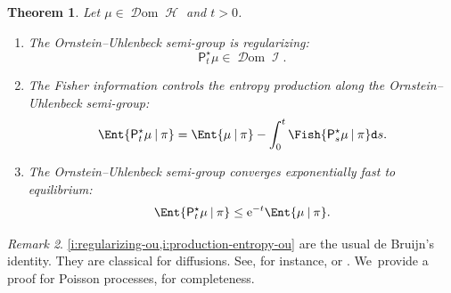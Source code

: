 \documentclass[JEP,XML,SOM,Unicode,published]{cedram}
\newtheorem{theorem}{Theorem}[section]
\theoremstyle{definition}
\theoremstyle{remark}
\newtheorem{remark}[theorem]{Remark}
\newcommand{\given}[1][]{%
\nonscript\:#1\vert
\allowbreak
\nonscript\:
\mathopen{}}
\DeclareMathOperator{\ent}{\mathcal{H}}
\DeclareMathOperator{\fish}{\mathcal{I}}
\DeclareMathOperator{\dom}{\mathscr{D}om}
\begin{document}
\begin{theorem}\label{t:properties-ou}
Let $\mu \in \dom \ent$ and $t > 0$.
\begin{enumerate}[$(\rm i)$, wide]
\item\label{i:regularizing-ou} The Ornstein--Uhlenbeck semi-group is regularizing:
\begin{equation}\label{e:regularizing-ou}
\mathsf{P}^{\star}_{t}\mu \in \dom \fish.
\end{equation}
\item\label{i:production-entropy-ou} The Fisher information controls the entropy production along the Ornstein--Uhlenbeck semi-group:
\begin{equation}\label{e:production-entropy-ou}
\Ent{\mathsf{P}^{\star}_{t}\mu \given \pi} = \Ent{\mu \given \pi} - \int_{0}^{t} \Fish{\mathsf{P}^{\star}_{s} \mu \given \pi} \mathtt{d} s.
\end{equation}
\item\label{i:exponential-convergence-entropy} The Ornstein--Uhlenbeck semi-group converges exponentially fast to equilibrium:
\begin{equation}\label{e:exponential-convergence-entropy}
\Ent{\mathsf{P}^{\star}_{t} \mu \given \pi} \leq \mathrm{e}^{-t} \Ent{\mu \given \pi}.
\end{equation}
\end{enumerate}
\end{theorem}

\begin{remark}
\cref{i:regularizing-ou,i:production-entropy-ou} are the usual de Bruijn's identity.
They are classical for diffusions.
See, for instance, \cite[Prop.\,5.2.2]{BGL} or \cite[Th.\,4.16]{AGSHeat}. We~provide a proof for Poisson processes, for completeness.
\end{remark}
\end{document}
